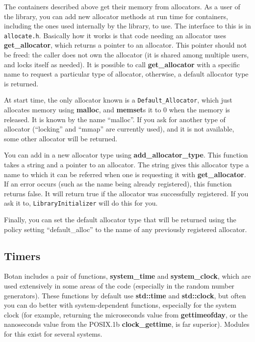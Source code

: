 \documentclass{article}
\newcommand{\filename}[1]{\texttt{#1}}
\newcommand{\function}[1]{\textbf{#1}}
\newcommand{\type}[1]{\texttt{#1}}
\begin{document}
The containers described above get their memory from allocators. As a user of
the library, you can add new allocator methods at run time for containers,
including the ones used internally by the library, to use. The interface to
this is in \filename{allocate.h}. Basically how it works is that code needing
an allocator uses \function{get\_allocator}, which returns a pointer to an
allocator. This pointer should not be freed: the caller does not own the
allocator (it is shared among multiple users, and locks itself as needed). It
is possible to call \function{get\_allocator} with a specific name to request a
particular type of allocator, otherwise, a default allocator type is returned.

At start time, the only allocator known is a \type{Default\_Allocator}, which
just allocates memory using \function{malloc}, and \function{memset}s it to 0
when the memory is released. It is known by the name ``malloc''. If you ask for
another type of allocator (``locking'' and ``mmap'' are currently used), and it
is not available, some other allocator will be returned.

You can add in a new allocator type using \function{add\_allocator\_type}. This
function takes a string and a pointer to an allocator. The string gives this
allocator type a name to which it can be referred when one is requesting it
with \function{get\_allocator}. If an error occurs (such as the name being
already registered), this function returns false. It will return true if the
allocator was successfully registered. If you ask it to,
\type{LibraryInitializer} will do this for you.

Finally, you can set the default allocator type that will be returned using
the policy setting ``default\_alloc'' to the name of any previously registered
allocator.

\subsection{Timers}

Botan includes a pair of functions, \function{system\_time} and
\function{system\_clock}, which are used extensively in some areas of the code
(especially in the random number generators). These functions by default use
\function{std::time} and \function{std::clock}, but often you can do better
with system-dependent functions, especially for the system clock (for example,
returning the microseconds value from \function{gettimeofday}, or the
nanoseconds value from the POSIX.1b \function{clock\_gettime}, is far
superior). Modules for this exist for several systems.
\end{document}
